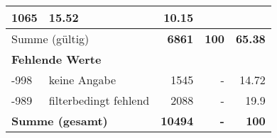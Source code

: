 \begin{longtable}{lXrrr}
       \num{1065} &
       \num[round-mode=places,round-precision=2]{15.52} &
         \num[round-mode=places,round-precision=2]{10.15} \\
     \midrule
     \multicolumn{2}{l}{Summe (gültig)} &
       \textbf{\num{6861}} &
     \textbf{\num{100}} &
       \textbf{\num[round-mode=places,round-precision=2]{65.38}} \\
     \multicolumn{5}{l}{\textbf{Fehlende Werte}}\\
       -998 &
       keine Angabe &
         \num{1545} &
        - &
         \num[round-mode=places,round-precision=2]{14.72} \\
       -989 &
       filterbedingt fehlend &
         \num{2088} &
        - &
         \num[round-mode=places,round-precision=2]{19.9} \\
     \midrule
     \multicolumn{2}{l}{\textbf{Summe (gesamt)}} &
          \textbf{\num{10494}} &
        \textbf{-} &
        \textbf{\num{100}} \\
     \bottomrule
     \end{longtable}
     
